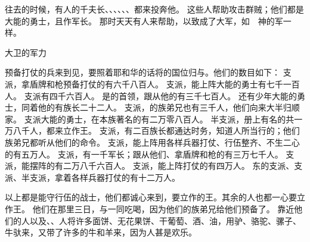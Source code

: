 {往{}去的时候，有{}人的千夫长{}、{}、{}、{}、{}、{}、{}都来投奔他。
这些人帮助{}攻击群贼；他们都是大能的勇士，且作军长。
那时天天有人来帮助{}，以致成了大军，如　神的军一样。
\par }{\SH 大卫的军力
\par }{\PP {}预备打仗的兵来到{}见{}，要照着耶和华的话将{}的国位归与{}。他们的数目如下：
支派，拿盾牌和枪预备打仗的有六千八百人。
支派，能上阵大能的勇士有七千一百人。
支派有四千六百人。
是{}{}的首领，跟从他的有三千七百人。
还有少年大能的勇士{}，同着他的有族长二十二人。
支派，{}的族弟兄也有三千人，他们向来大半归顺{}家。
支派大能的勇士，在本族著名的有二万零八百人。
半支派，册上有名的共一万八千人，都来立{}作王。
支派，有二百族长都通达时务，知道{}人所当行的；他们族弟兄都听从他们的命令。
支派，能上阵用各样兵器打仗、行伍整齐、不生二心的有五万人。
支派，有一千军长；跟从他们、拿盾牌和枪的有三万七千人。
支派，能摆阵的有二万八千六百人。
支派，能上阵打仗的有四万人。
东的{}支派、{}支派、{}半支派，拿着各样兵器打仗的有十二万人。
\par }{\PP {}以上都是能守行伍的战士，他们都诚心来到{}，要立{}作{}的王。{}其余的人也都一心要立{}作王。
他们在那里三日，与{}一同吃喝，因为他们的族弟兄给他们预备了。
靠近他们的人以及{}、{}、{}人将许多面饼、无花果饼、干葡萄、酒、油，用驴、骆驼、骡子、牛驮来，又带了许多的牛和羊来，因为{}人甚是欢乐。

}

